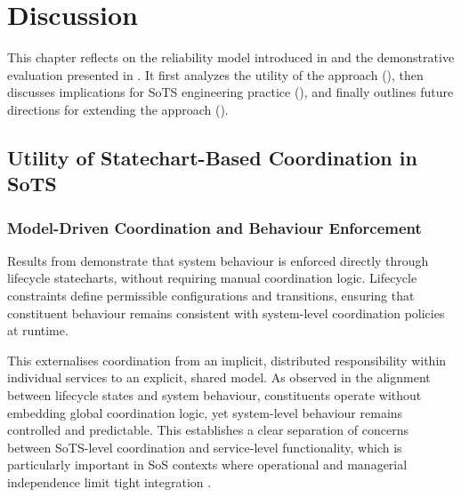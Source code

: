 \chapter{Discussion}\label{ch:discussion}
This chapter reflects on the reliability model introduced in  and the demonstrative evaluation presented in . It first analyzes the utility of the approach (), then discusses implications for SoTS engineering practice (), and finally outlines future directions for extending the approach ().




\section{Utility of Statechart-Based Coordination in SoTS}\label{sec:discussion-utility}
\subsection{Model-Driven Coordination and Behaviour Enforcement}

Results from  demonstrate that system behaviour is enforced directly through lifecycle statecharts, without requiring manual coordination logic. Lifecycle constraints define permissible configurations and transitions, ensuring that constituent behaviour remains consistent with system-level coordination policies at runtime.

This externalises coordination from an implicit, distributed responsibility within individual services to an explicit, shared model. As observed in the alignment between lifecycle states and system behaviour, constituents operate without embedding global coordination logic, yet system-level behaviour remains controlled and predictable. This establishes a clear separation of concerns between SoTS-level coordination and service-level functionality, which is particularly important in SoS contexts where operational and managerial independence limit tight integration \cite{maier1998architecting}.

